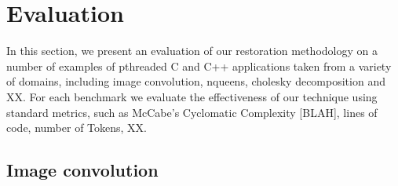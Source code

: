 %
%
%
%
%

\section{Evaluation}
\label{sec:evaluation}

In this section, we present an evaluation of our restoration methodology on a number of examples of pthreaded C and C++ applications taken from a variety of domains, including image convolution, nqueens, cholesky decomposition and XX. For each benchmark we evaluate the effectiveness of our technique using standard metrics, such as McCabe's Cyclomatic Complexity [BLAH], lines of code, number of Tokens, XX. 

\subsection{Image convolution}

